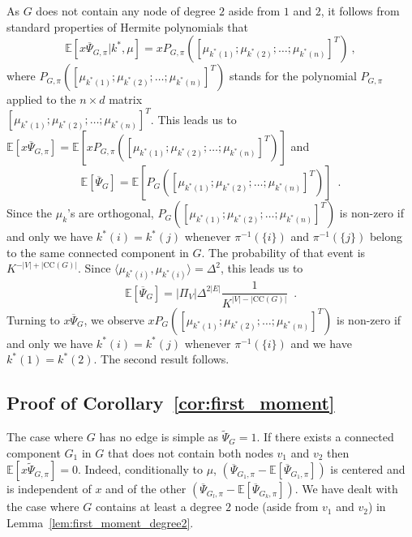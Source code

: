 \documentclass{article}
\begin{document}
    As $G$ does not contain any node of degree $2$ aside from $1$ and $2$, it follows from standard properties of Hermite polynomials that 
    \begin{equation}\label{eq}
    \mathbb{E}[x\overline{\Psi}_{G,\pi}|k^*,\mu]= xP_{G,\pi}([\mu_{k^*(1)};\mu_{k^*(2)};\ldots;\mu_{k^*(n)}]^T )\ , 
    \end{equation}
    where $P_{G,\pi}([\mu_{k^*(1)};\mu_{k^*(2)};\ldots;\mu_{k^*(n)}]^T)$ stands for the polynomial $P_{G,\pi}$ applied to the $n\times d$ matrix ~\\ $[\mu_{k^*(1)};\mu_{k^*(2)};\ldots;\mu_{k^*(n)}]^T$. This leads us to 
    $\mathbb{E}[x\overline{\Psi}_{G,\pi}]= \mathbb{E}\left[x P_{G,\pi}([\mu_{k^*(1)};\mu_{k^*(2)};\ldots;\mu_{k^*(n)}]^T )\right]$
    and 
    \[
    \mathbb{E}[\overline{\Psi}_{G}]= \mathbb{E}\left[P_{G}([\mu_{k^*(1)};\mu_{k^*(2)};\ldots;\mu_{k^*(n)}]^T )\right]\enspace . 
    \]
    Since the $\mu_k$'s are orthogonal, $P_{G}([\mu_{k^*(1)};\mu_{k^*(2)};\ldots;\mu_{k^*(n)}]^T)$ is non-zero if and only we have  $k^*(i)= k^*(j)$ whenever $\pi^{-1}(\{i\})$ and $\pi^{-1}(\{j\})$ belong to the same connected component in $G$. The probability of that event is $K^{-|V|+|\mathrm{CC}(G)|}$. Since $\langle \mu_{k^*(i)},\mu_{k^*(i)}\rangle= \Delta^2$, this leads us to 
    \[
    \mathbb{E}[\overline{\Psi}_G]= |\Pi_V| \Delta^{2|E|}\frac{1}{K^{|V|-|\mathrm{CC}(G)|}}\enspace .
    \]
    Turning to $x\overline{\Psi}_G$, we observe $xP_{G}([\mu_{k^*(1)};\mu_{k^*(2)};\ldots;\mu_{k^*(n)}]^T )$ is non-zero if and only we have  $k^*(i)= k^*(j)$ whenever $\pi^{-1}(\{i\})$ and we have $k^*(1)=k^*(2)$. The second result follows. 

    

    \subsection{Proof of Corollary~\ref{cor:first_moment}}
        The case where $G$ has no edge is simple as $\widetilde{\Psi}_G=1$. 
        If there exists a connected component $G_1$ in $G$ that does not contain both nodes  $v_1$ and $v_2$ then $\mathbb{E}[x\widetilde{\Psi}_{G,\pi}]= 0$. Indeed, conditionally to $\mu$, $(\overline{\Psi}_{G_1,\pi}-\mathbb{E}[\overline{\Psi}_{G_1,\pi}])$ is centered and is independent of $x$ and of the other $(\overline{\Psi}_{G_l,\pi}-\mathbb{E}[\overline{\Psi}_{G_k,\pi}])$. We have dealt with the case where $G$ contains at least a degree $2$ node (aside from $v_1$ and $v_2$) in Lemma~\ref{lem:first_moment_degree2}. 
        
\end{document}
